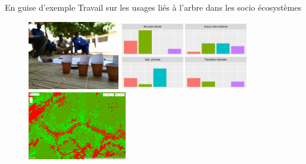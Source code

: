 \documentclass[newPxFont]{beamer}
\begin{document}
\begin{frame}[c]{En guise d'exemple}
\vspace{-2em}
Travail sur les usages liés à l'arbre dans les socio écosystèmes
\begin{figure}
	\centering
	\includegraphics[height = 3cm]{img/ateliers}
  \includegraphics[height = 3cm]{img/bar_general}\\
  \includegraphics[height = 3cm]{img/class_CART}
\end{figure}
\end{frame}
\end{document}

